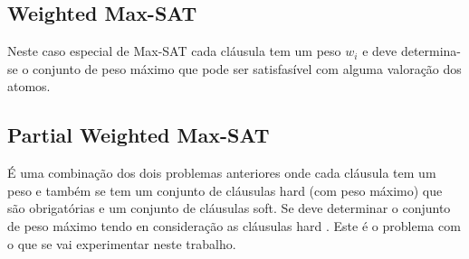 \subsection{Weighted Max-SAT}
	Neste caso especial de Max-SAT cada cláusula tem um peso $w_i$ e deve determina-se o conjunto de peso máximo que pode ser satisfasível com alguma valoração dos atomos.

\subsection{Partial Weighted Max-SAT}
	É uma combinação dos dois problemas anteriores onde cada cláusula tem um peso e também se tem um conjunto de cláusulas hard (com peso máximo) que são obrigatórias e um conjunto de cláusulas soft. Se deve determinar o conjunto de peso máximo tendo en consideração as cláusulas hard \cite{LabIA15}. Este é o problema com o que se vai experimentar neste trabalho.